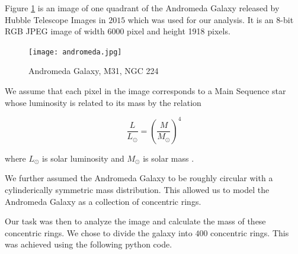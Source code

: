  Figure \ref{andromeda_image} is an image of one quadrant of the Andromeda Galaxy released by Hubble Telescope Images in $2015$ which was used for our analysis. It is an 8-bit RGB JPEG image of width 6000 pixel and height 1918 pixels.
    
\begin{figure}[h!]
\label{andromeda_image}
\centering
\texttt{[image: andromeda.jpg]}
\caption{Andromeda Galaxy, M31, NGC 224}
\end{figure}

We assume that each pixel in the image corresponds to a Main Sequence star whose luminosity is related to its mass by the relation 

\begin{equation}
\frac{L}{L_{\odot}} = (\frac{M}{M_{\odot}})^4 
\end{equation}

where $L_{\odot}$ is solar luminosity and $M_{\odot}$ is solar mass \cite{LMratio}.

We further assumed the Andromeda Galaxy to be roughly circular with a cylinderically symmetric mass distribution. This allowed us to model the Andromeda Galaxy as a collection of concentric rings. 

Our task was then to analyze the image and calculate the mass of these concentric rings. We chose to divide the galaxy into $400$ concentric rings. This was achieved using the following python code.

